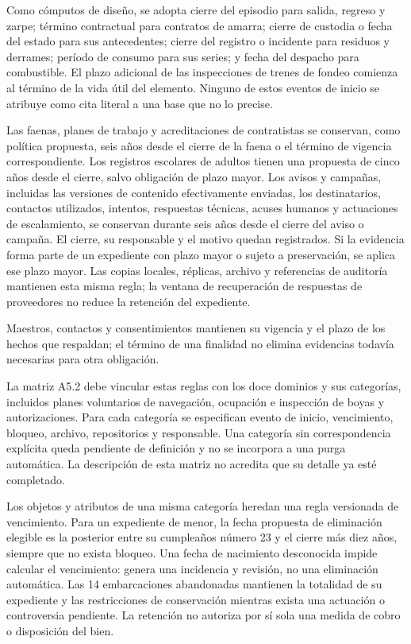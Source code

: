 Como cómputos de diseño, se adopta cierre del episodio para salida, regreso y zarpe; término contractual para contratos de amarra; cierre de custodia o fecha del estado para sus antecedentes; cierre del registro o incidente para residuos y derrames; período de consumo para sus series; y fecha del despacho para combustible. El plazo adicional de las inspecciones de trenes de fondeo comienza al término de la vida útil del elemento. Ninguno de estos eventos de inicio se atribuye como cita literal a una base que no lo precise.

Las faenas, planes de trabajo y acreditaciones de contratistas se conservan, como política propuesta, seis años desde el cierre de la faena o el término de vigencia correspondiente. Los registros escolares de adultos tienen una propuesta de cinco años desde el cierre, salvo obligación de plazo mayor.  Los avisos y campañas, incluidas las versiones de contenido efectivamente enviadas, los destinatarios, contactos utilizados, intentos, respuestas técnicas, acuses humanos y actuaciones de escalamiento, se conservan durante seis años desde el cierre del aviso o campaña. El cierre, su responsable y el motivo quedan registrados. Si la evidencia forma parte de un expediente con plazo mayor o sujeto a preservación, se aplica ese plazo mayor. Las copias locales, réplicas, archivo y referencias de auditoría mantienen esta misma regla; la ventana de recuperación de respuestas de proveedores no reduce la retención del expediente.

Maestros, contactos y consentimientos mantienen su vigencia y el plazo de los hechos que respaldan; el término de una finalidad no elimina evidencias todavía necesarias para otra obligación.

La matriz A5.2 debe vincular estas reglas con los doce dominios y sus categorías, incluidos planes voluntarios de navegación, ocupación e inspección de boyas y autorizaciones. Para cada categoría se especifican evento de inicio, vencimiento, bloqueo, archivo, repositorios y responsable. Una categoría sin correspondencia explícita queda pendiente de definición y no se incorpora a una purga automática. La descripción de esta matriz no acredita que su detalle ya esté completado.

Los objetos y atributos de una misma categoría heredan una regla versionada de vencimiento. Para un expediente de menor, la fecha propuesta de eliminación elegible es la posterior entre su cumpleaños número 23 y el cierre más diez años, siempre que no exista bloqueo. Una fecha de nacimiento desconocida impide calcular el vencimiento: genera una incidencia y revisión, no una eliminación automática. Las 14 embarcaciones abandonadas mantienen la totalidad de su expediente y las restricciones de conservación mientras exista una actuación o controversia pendiente. La retención no autoriza por sí sola una medida de cobro o disposición del bien.

